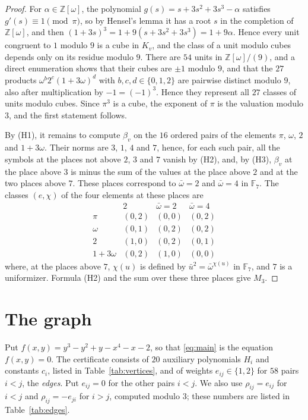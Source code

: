 \documentclass[11pt]{article}
\newcommand{\Z}{\mathbb{Z}}
\newcommand{\F}{\mathbb{F}}
\begin{document}
\begin{proof}
For $\alpha\in\Z[\omega]$, the polynomial $g(s)=s+3s^2+3s^3-\alpha$ satisfies $g'(s)\equiv1\pmod\pi$, so by Hensel's lemma it has a root $s$ in the completion of $\Z[\omega]$, and then $(1+3s)^3=1+9(s+3s^2+3s^3)=1+9\alpha$. Hence every unit congruent to $1$ modulo $9$ is a cube in $K_v$, and the class of a unit modulo cubes depends only on its residue modulo $9$. There are $54$ units in $\Z[\omega]/(9)$, and a direct enumeration shows that their cubes are $\pm1$ modulo $9$, and that the $27$ products $\omega^b2^c(1+3\omega)^d$ with $b,c,d\in\{0,1,2\}$ are pairwise distinct modulo $9$, also after multiplication by $-1=(-1)^3$. Hence they represent all $27$ classes of units modulo cubes. Since $\pi^3$ is a cube, the exponent of $\pi$ is the valuation modulo $3$, and the first statement follows.

By (H1), it remains to compute $\beta_v$ on the $16$ ordered pairs of the elements $\pi$, $\omega$, $2$ and $1+3\omega$. Their norms are $3$, $1$, $4$ and $7$, hence, for each such pair, all the symbols at the places not above $2$, $3$ and $7$ vanish by (H2), and, by (H3), $\beta_v$ at the place above $3$ is minus the sum of the values at the place above $2$ and at the two places above $7$. These places correspond to $\bar\omega=2$ and $\bar\omega=4$ in $\F_7$. The classes $(e,\chi)$ of the four elements at these places are
\[
\begin{array}{c|ccc}
 & 2 & \bar\omega=2 & \bar\omega=4\\\hline
\pi & (0,2) & (0,0) & (0,2)\\
\omega & (0,1) & (0,2) & (0,2)\\
2 & (1,0) & (0,2) & (0,1)\\
1+3\omega & (0,2) & (1,0) & (0,0)
\end{array}
\]
where, at the places above $7$, $\chi(u)$ is defined by $\bar u^2=\bar\omega^{\chi(u)}$ in $\F_7$, and $7$ is a uniformizer. Formula (H2) and the sum over these three places give $M_3$.
\end{proof}

\section{The graph}\label{sec:graph}

Put $f(x,y)=y^3-y^2+y-x^4-x-2$, so that \eqref{eq:main} is the equation $f(x,y)=0$. The certificate consists of $20$ auxiliary polynomials $H_i$ and constants $c_i$, listed in Table~\ref{tab:vertices}, and of weights $e_{ij}\in\{1,2\}$ for $58$ pairs $i<j$, the \emph{edges}. Put $e_{ij}=0$ for the other pairs $i<j$. We also use $\rho_{ij}=e_{ij}$ for $i<j$ and $\rho_{ij}=-e_{ji}$ for $i>j$, computed modulo $3$; these numbers are listed in Table~\ref{tab:edges}.
\end{document}
